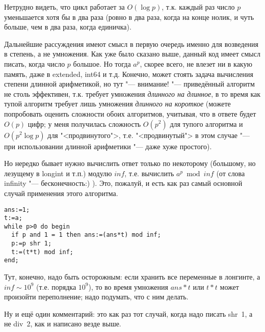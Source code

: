 Нетрудно видеть, что цикл работает за $O(\log p)$, т.к. каждый раз число $p$ уменьшается хотя бы 
в два раза (ровно в два раза, когда на конце нолик, и чуть больше, чем в два раза, когда единичка).

Дальнейшие рассуждения имеют смысл в первую очередь именно для возведения в степень, а не умножения. 
Как уже было сказано выше, данный код имеет смысл писать, когда число $p$ большое. Но тогда $a^p$, 
скорее всего, не влезет ни в какую память, даже в extended, int64 и т.д. Конечно, может стоять 
задача вычисления степени длинной арифметикой, но тут "--- внимание! "--- приведённый алгоритм 
не столь эффективен, т.к. требует умножения \textit{длинного на длинное}, в то время как тупой 
алгоритм требует лишь умножения \textit{длинного на короткое} (можете попробовать оценить сложности 
обоих алгоритмов, учитывая, что в ответе будет $O(p)$ цифр; у меня получилась сложность $O(p^2)$ 
для тупого алгоритма и $O(p^2\log p)$ для "<продвинутого">, т.е. "<продвинутый"> в этом случае "--- 
при использовании длинной арифметики "--- даже хуже простого).

Но нередко бывает нужно вычислить ответ только по некоторому (большому, но лезущему в longint и т.п.) модулю $inf$, т.е. 
вычислить $a^p \bmod inf$ (от слова infinity "--- бесконечность:) ).  Это, пожалуй, и есть как раз 
самый основной случай применения этого алгоритма.

\begin{codesampleo}\begin{verbatim}
ans:=1;
t:=a;
while p>0 do begin
  if p and 1 = 1 then ans:=(ans*t) mod inf;
  p:=p shr 1;
  t:=(t*t) mod inf;
end;
\end{verbatim}
\end{codesampleo}

Тут, конечно, надо быть осторожным: если хранить все переменные в лонгинте, а $inf\sim 10^9$ (т.е. 
порядка $10^9$), то во время умножения $ans*t$ или $t*t$ может произойти переполнение; надо 
подумать, что с ним делать.

Ну и ещё один комментарий: это как раз тот случай, когда надо писать shr~1, а не div~2, как и 
написано везде выше.
